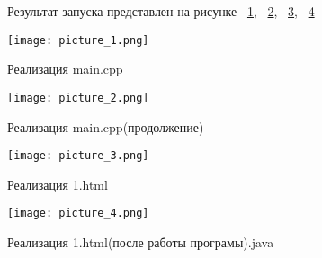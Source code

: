 \documentclass[a4paper, 14pt]{extarticle}
\begin{document}
\begin{figure}[!htb]
Результат запуска представлен на рисунке ~\ref{fig:picture_1.png}, ~\ref{fig:picture_2.png}, ~\ref{fig:picture_3.png}, ~\ref{fig:picture_4.png}
\end{figure}

\begin{figure}[!htb]
	\centering
	\texttt{[image: picture\_1.png]}
\caption{Реализация main.cpp}
\label{fig:picture_1.png}
\end{figure}

\begin{figure}[!htb]
	\centering
	\texttt{[image: picture\_2.png]}
\caption{Реализация main.cpp(продолжение)}
\label{fig:picture_2.png}
\end{figure}

\begin{figure}[!htb]
	\centering
	\texttt{[image: picture\_3.png]}
\caption{Реализация 1.html}
\label{fig:picture_3.png}
\end{figure}

\begin{figure}[!htb]
	\centering
	\texttt{[image: picture\_4.png]}
\caption{Реализация 1.html(после работы програмы).java}
\label{fig:picture_4.png}
\end{figure}
\end{document}
